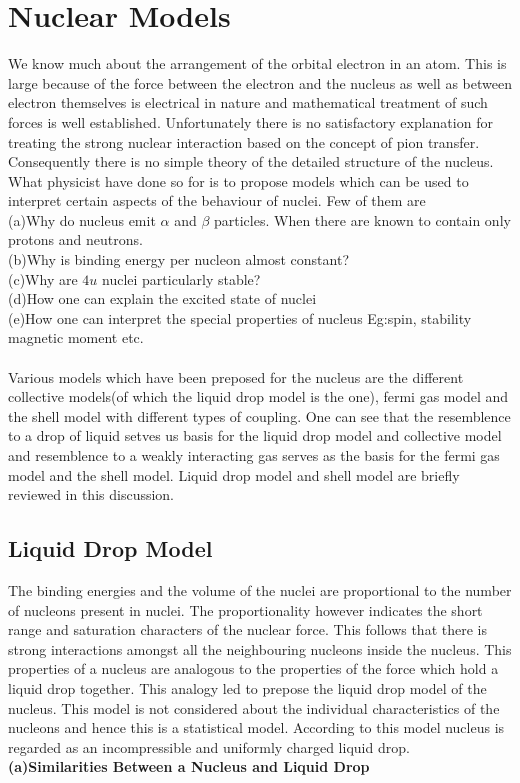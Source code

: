 \chapter{Nuclear Models}
We know much about the arrangement of the orbital electron in an atom. This is large because of the force between the electron and the nucleus as well as between electron themselves is electrical in nature and mathematical treatment of such forces is well established. Unfortunately there is no satisfactory explanation for treating the strong nuclear interaction based on the concept of pion transfer. Consequently there is no simple theory of the detailed structure of the nucleus.\\
What physicist have done so for is to propose models which can be used to interpret certain aspects of the behaviour of nuclei. Few of them are\\
(a)\quad Why do nucleus emit $\alpha$ and $\beta$ particles. When there are known to contain only protons and neutrons. \\
(b)\quad Why is binding energy per nucleon almost constant? \\
(c)\quad Why are $4u$ nuclei particularly stable?\\
(d)\quad How one can explain the excited state of nuclei\\
(e)\quad How one can interpret the special properties of nucleus 
Eg:\quad spin, stability magnetic moment etc.\\\\
Various models which have been preposed for the nucleus are the different collective models(of which the liquid drop model is the one), fermi gas model and the shell model with different types of coupling. One can see that the resemblence to a drop of liquid setves us basis for the liquid drop model and collective model and resemblence to a weakly interacting gas serves as the basis for the fermi gas model and the shell model. Liquid drop model and shell model are briefly reviewed in this discussion.  \\
\section{Liquid Drop Model}
The binding energies and the volume of the nuclei are proportional to the number of nucleons present in nuclei. The proportionality however indicates the short range and saturation characters of the nuclear force. This follows that there is strong interactions amongst all the neighbouring nucleons inside the nucleus. This properties of a nucleus are analogous to the properties of the force which hold a liquid drop together. This analogy led to prepose the liquid drop model of the nucleus. This model is not considered about the individual characteristics of the nucleons and hence this is a statistical model. According to this model nucleus is regarded as an incompressible and uniformly charged liquid drop.\\
\textbf{(a)\quad Similarities Between a Nucleus and Liquid 
	Drop}\\

